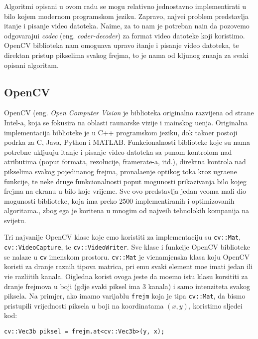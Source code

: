 Algoritmi opisani u ovom radu se mogu relativno jednostavno implementirati u bilo kojem modernom programskom jeziku. Zapravo, najve\cj i problem predstavlja \ch itanje i pisanje video datoteka. Naime,
za to nam je potreban na\ch in da pozovemo odgovaraju\cj i \textit{codec} (eng. \textit{coder-decoder}) za format video datoteke koji koristimo. OpenCV biblioteka nam omogu\cj ava upravo \ch itanje
i pisanje video datoteka, te direktan pristup pikselima svakog frejma, \sh to je nama od klju\ch nog zna\ch aja za svaki opisani algoritam.

\subsection{OpenCV} %
OpenCV (eng. \textit{Open Computer Vision} je biblioteka originalno razvijena od strane Intel-a, koja se fokusira na oblasti ra\ch unarske vizije i ma\sh inskog u\ch enja. Originalna implementacija biblioteke
je u C++ programskom jeziku, dok tako\dj er postoji podr\sh ka za C, Java, Python i MATLAB. Funkcionalnosti biblioteke koje su nama potrebne uklju\ch uju \ch itanje i pisanje video datoteka sa punom
kontrolom nad atributima (poput formata, rezolucije, framerate-a, itd.), direktna kontrola nad pikselima svakog pojedina\ch nog frejma, pronala\zh enje opti\ch kog toka kroz ugra\dj ene funkcije, te neke
druge funkcionalnosti poput mogu\cj nosti prikazivanja bilo kojeg frejma na ekranu u bilo koje vrijeme. Sve ovo predstavlja jedan veoma mali dio mogu\cj nosti biblioteke, koja ima preko 2500 implementiranih
i optimizovanih algoritama., zbog \ch ega je kori\sh tena u mnogim od najve\cj ih tehnolo\sh kih kompanija na svijetu.

Tri najva\zh nije OpenCV klase koje \cj emo koristiti za implementaciju su \lstinline{cv::Mat}, \lstinline{cv::VideoCapture}, te \lstinline{cv::VideoWriter}. Sve klase i funkcije OpenCV biblioteke se nalaze u \lstinline{cv}
imenskom prostoru. \lstinline{cv::Mat} je vi\sh enamjenska klasa koju OpenCV koristi za dr\zh anje raznih tipova matrica, pri \ch emu svaki element mo\zh e imati jedan ili vi\sh e razli\ch itih kanala. O\ch igledna
korist ovoga jeste da mo\zh emo istu klasu korsititi za dr\zh anje frejmova u boji (gdje svaki piksel ima 3 kanala) i samo intenziteta svakog piksela. Na primjer, ako imamo varijablu \lstinline{frejm} koja je tipa
\lstinline{cv::Mat}, da bismo pristupili vrijednosti piksela u boji na koordinatama $(x,y)$, koristimo sljede\cj i kod:
\begin{lstlisting}
cv::Vec3b piksel = frejm.at<cv::Vec3b>(y, x);
\end{lstlisting}

